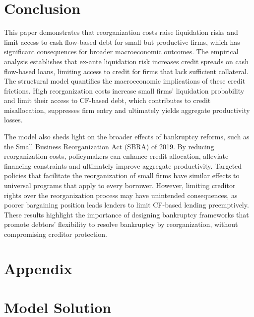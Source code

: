 \documentclass[12pt]{article}
\begin{document}
\newpage

\section{Conclusion}

This paper demonstrates that reorganization costs raise liquidation risks and limit access to cash flow-based debt for small but productive firms, which has significant consequences for broader macroeconomic outcomes. The empirical analysis establishes that ex-ante liquidation risk increases credit spreads on cash flow-based loans, limiting access to credit for firms that lack sufficient collateral. The structural model quantifies the macroeconomic implications of these credit frictions. High reorganization costs increase small firms' liquidation probability and limit their access to CF-based debt, which contributes to credit misallocation, suppresses firm entry and ultimately yields aggregate productivity losses. 

The model also sheds light on the broader effects of bankruptcy reforms, such as the Small Business Reorganization Act (SBRA) of 2019. By reducing reorganization costs, policymakers can enhance credit allocation, alleviate financing constraints and ultimately improve aggregate productivity. Targeted policies that facilitate the reorganization of small firms have similar effects to universal programs that apply to every borrower. However, limiting creditor rights over the reorganization process may have unintended consequences, as poorer bargaining position leads lenders to limit CF-based lending preemptively. These results highlight the importance of designing bankruptcy frameworks that promote debtors' flexibility to resolve bankruptcy by reorganization, without compromising creditor protection.

\newpage

\appendix
\section*{Appendix}
\section{Model Solution \label{sec: qualitative analysis}}
\end{document}
